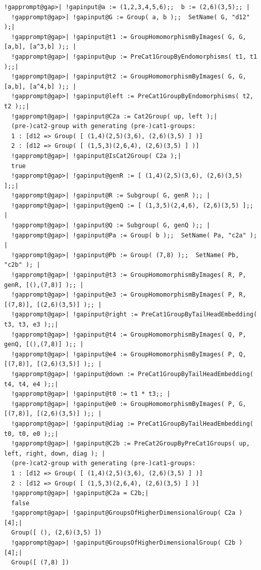 \documentclass[a4paper,11pt]{report}
\begin{document}
{{\begin{Verbatim}[commandchars=!@|,fontsize=\small,frame=single,label=Example]
  !gapprompt@gap>| !gapinput@a := (1,2,3,4,5,6);;  b := (2,6)(3,5);; |
  !gapprompt@gap>| !gapinput@G := Group( a, b );;  SetName( G, "d12" );|
  !gapprompt@gap>| !gapinput@t1 := GroupHomomorphismByImages( G, G, [a,b], [a^3,b] );; |
  !gapprompt@gap>| !gapinput@up := PreCat1GroupByEndomorphisms( t1, t1 );;|
  !gapprompt@gap>| !gapinput@t2 := GroupHomomorphismByImages( G, G, [a,b], [a^4,b] );; |
  !gapprompt@gap>| !gapinput@left := PreCat1GroupByEndomorphisms( t2, t2 );;|
  !gapprompt@gap>| !gapinput@C2a := Cat2Group( up, left );|
  (pre-)cat2-group with generating (pre-)cat1-groups:
  1 : [d12 => Group( [ (1,4)(2,5)(3,6), (2,6)(3,5) ] )]
  2 : [d12 => Group( [ (1,5,3)(2,6,4), (2,6)(3,5) ] )]
  !gapprompt@gap>| !gapinput@IsCat2Group( C2a );|
  true
  !gapprompt@gap>| !gapinput@genR := [ (1,4)(2,5)(3,6), (2,6)(3,5) ];;|
  !gapprompt@gap>| !gapinput@R := Subgroup( G, genR );; |
  !gapprompt@gap>| !gapinput@genQ := [ (1,3,5)(2,4,6), (2,6)(3,5) ];; |
  !gapprompt@gap>| !gapinput@Q := Subgroup( G, genQ );; |
  !gapprompt@gap>| !gapinput@Pa := Group( b );;  SetName( Pa, "c2a" ); |
  !gapprompt@gap>| !gapinput@Pb := Group( (7,8) );;  SetName( Pb, "c2b" ); |
  !gapprompt@gap>| !gapinput@t3 := GroupHomomorphismByImages( R, P, genR, [(),(7,8)] );; |
  !gapprompt@gap>| !gapinput@e3 := GroupHomomorphismByImages( P, R, [(7,8)], [(2,6)(3,5)] );; |
  !gapprompt@gap>| !gapinput@right := PreCat1GroupByTailHeadEmbedding( t3, t3, e3 );;|
  !gapprompt@gap>| !gapinput@t4 := GroupHomomorphismByImages( Q, P, genQ, [(),(7,8)] );; |
  !gapprompt@gap>| !gapinput@e4 := GroupHomomorphismByImages( P, Q, [(7,8)], [(2,6)(3,5)] );; |
  !gapprompt@gap>| !gapinput@down := PreCat1GroupByTailHeadEmbedding( t4, t4, e4 );;|
  !gapprompt@gap>| !gapinput@t0 := t1 * t3;; |
  !gapprompt@gap>| !gapinput@e0 := GroupHomomorphismByImages( P, G, [(7,8)], [(2,6)(3,5)] );; |
  !gapprompt@gap>| !gapinput@diag := PreCat1GroupByTailHeadEmbedding( t0, t0, e0 );;|
  !gapprompt@gap>| !gapinput@C2b := PreCat2GroupByPreCat1Groups( up, left, right, down, diag ); |
  (pre-)cat2-group with generating (pre-)cat1-groups:
  1 : [d12 => Group( [ (1,4)(2,5)(3,6), (2,6)(3,5) ] )]
  2 : [d12 => Group( [ (1,5,3)(2,6,4), (2,6)(3,5) ] )]
  !gapprompt@gap>| !gapinput@C2a = C2b;|
  false
  !gapprompt@gap>| !gapinput@GroupsOfHigherDimensionalGroup( C2a )[4];|
  Group([ (), (2,6)(3,5) ])
  !gapprompt@gap>| !gapinput@GroupsOfHigherDimensionalGroup( C2b )[4];|
  Group([ (7,8) ])
  
\end{Verbatim}
 

}}
\end{document}
